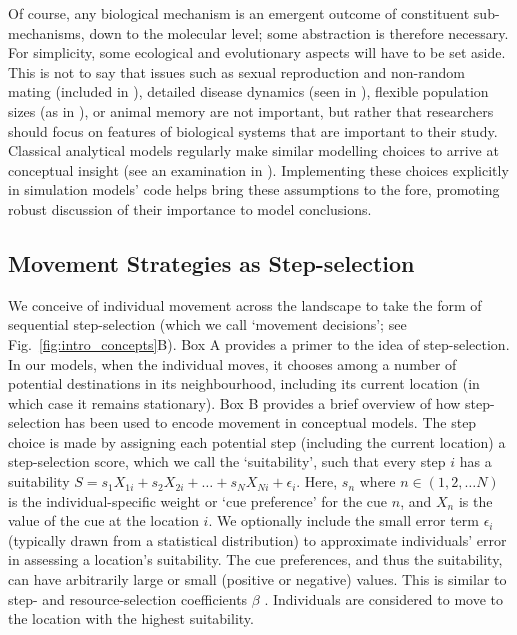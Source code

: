 Of course, any biological mechanism is an emergent outcome of constituent sub-mechanisms, down to the molecular level; some abstraction is therefore necessary.
For simplicity, some ecological and evolutionary aspects will have to be set aside.
This is not to say that issues such as sexual reproduction and non-random mating (included in \cite{getz2016}), detailed disease dynamics (seen in \cite{white2018,scherer2020}), flexible population sizes (as in \cite{netz2021}), or animal memory \parencite[e.g.][]{bracis2017,robira2021} are not important, but rather that researchers should focus on features of biological systems that are important to their study.
Classical analytical models regularly make similar modelling choices to arrive at conceptual insight (see an examination in \cite{vandermeer1997}).
Implementing these choices explicitly in simulation models' code helps bring these assumptions to the fore, promoting robust discussion of their importance to model conclusions.

\subsection*{Movement Strategies as Step-selection}

We conceive of individual movement across the landscape to take the form of sequential step-selection (which we call `movement decisions'; see Fig.~\ref{fig:intro_concepts}B).
Box A provides a primer to the idea of step-selection.
In our models, when the individual moves, it chooses among a number of potential destinations in its neighbourhood, including its current location (in which case it remains stationary).
Box B provides a brief overview of how step-selection has been used to encode movement in conceptual models.
The step choice is made by assigning each potential step (including the current location) a step-selection score, which we call the `suitability', such that every step $i$ has a suitability $S = s_{1}X_{1i} + s_{2}X_{2i} + \ldots + s_{N}X_{Ni} + \epsilon_i$.
Here, $s_n$ where $n \in (1, 2, \ldots N)$ is the individual-specific weight or `cue preference' for the cue $n$, and $X_n$ is the value of the cue at the location $i$.
We optionally include the small error term $\epsilon_i$ (typically drawn from a statistical distribution) to approximate individuals' error in assessing a location's suitability.
The cue preferences, and thus the suitability, can have arbitrarily large or small (positive or negative) values.
This is similar to step- and resource-selection coefficients $\beta$ \parencite[see Box 2][]{fortin2005,manly2002}.
Individuals are considered to move to the location with the highest suitability.

